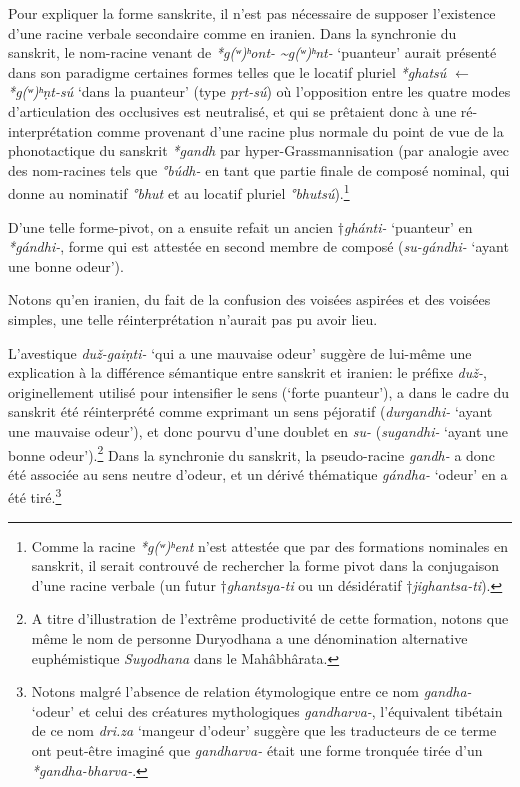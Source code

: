\documentclass[11pt]{article}
\newcommand{\ipa}[1]{{\phon\textit{#1}}}
\begin{document}
Pour expliquer la forme sanskrite, il n'est pas nécessaire de supposer l'existence d'une racine verbale secondaire comme en iranien. Dans la synchronie du sanskrit, le nom-racine venant de \ipa{*g(ʷ)ʰont- \textasciitilde *g(ʷ)ʰnt-} `puanteur' aurait présenté dans son paradigme certaines formes telles que le locatif pluriel \ipa{*ghatsú} $\leftarrow$ \ipa{*g(ʷ)ʰṇt-sú} `dans la puanteur' (type \ipa{pṛt-sú}) où l'opposition entre les quatre modes d'articulation des occlusives est neutralisé, et qui se prêtaient donc à une ré-interprétation comme provenant d'une racine plus normale du point de vue de la phonotactique du sanskrit \ipa{*gandh} par hyper-Grassmannisation (par analogie avec des nom-racines tels que \ipa{°búdh-} en tant que partie finale de composé nominal, qui donne au nominatif \ipa{°bhut} et au locatif pluriel \ipa{°bhutsú}).\footnote{Comme la racine \ipa{*g(ʷ)ʰent} n'est attestée que par des formations nominales en sanskrit, il serait controuvé de rechercher la forme pivot dans la conjugaison d'une racine verbale (un futur $\dagger$\ipa{ghantsya-ti} ou un désidératif $\dagger$\ipa{jighantsa-ti}). }

D'une telle forme-pivot, on a ensuite refait un ancien $\dagger$\ipa{ghánti-} `puanteur' en \ipa{*gándhi-}, forme qui est attestée en second membre de composé (\ipa{su-gándhi-} `ayant une bonne odeur').

Notons qu'en iranien, du fait de la confusion des voisées aspirées et des voisées simples, une telle réinterprétation n'aurait pas pu avoir lieu.

L'avestique \ipa{duž-gaiṇti-} `qui a une mauvaise odeur' suggère de lui-même une explication à la différence sémantique entre sanskrit et iranien: le préfixe \ipa{duž-}, originellement utilisé pour intensifier le sens (`forte puanteur'), a dans le cadre du sanskrit été réinterprété comme exprimant un sens péjoratif (\ipa{durgandhi-} `ayant une mauvaise odeur'), et donc pourvu d'une doublet en \ipa{su-} (\ipa{sugandhi-} `ayant une bonne odeur').\footnote{A titre d'illustration de l'extrême productivité de cette formation, notons que même le nom de personne Duryodhana a  une dénomination alternative euphémistique \textit{Suyodhana} dans le Mahâbhârata.} Dans la synchronie du sanskrit, la pseudo-racine \ipa{gandh-} a donc été associée au sens neutre d'odeur, et un dérivé thématique \ipa{gándha-} `odeur' en a été tiré.\footnote{Notons malgré l'absence de relation étymologique entre ce nom \ipa{gandha-} `odeur' et celui des créatures mythologiques \ipa{gandharva-}, l'équivalent tibétain de ce nom \ipa{dri.za} `mangeur d'odeur' suggère que les traducteurs de ce terme ont peut-être imaginé que \ipa{gandharva-} était une forme tronquée tirée d'un \ipa{*gandha-bharva-}.}
\end{document}
